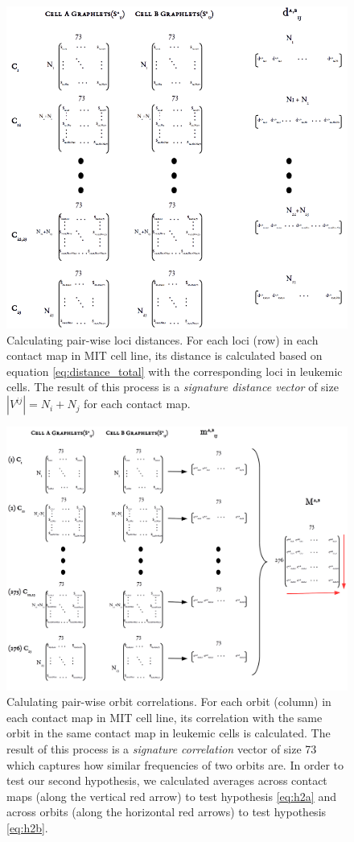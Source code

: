 \documentclass[a4,center,fleqn]{NAR}
\begin{document}
\begin{figure}
    \centering
    \includegraphics[width=.5\textwidth]{figures/graphlet_distance_schema.png}
    \caption{Calculating pair-wise loci distances. For each loci (row) 
    in each
    contact map in MIT cell line, its distance is calculated based on
    equation \ref{eq:distance_total} with the corresponding loci in
    leukemic cells. The result of this process is a 
    \textit{signature distance vector} of size
    $|V^{ij}| = N_i+N_j$ for each contact map.
    }
    \label{graphlet_distance_schema}
\end{figure}
\begin{figure}
    \centering
    \includegraphics[width=.5\textwidth]{figures/graphlet_correlation_schema.png}
    \caption{Calulating pair-wise orbit correlations. For each orbit (column)
    in each contact map in MIT cell line, its correlation with the
    same orbit in the same contact map 
    in leukemic cells is calculated. The result of
    this process is a \textit{signature correlation} vector of size
    73 which captures how similar frequencies of two orbits are.
    In order to test our second hypothesis, we calculated averages
    across contact maps (along the vertical red arrow) to test 
    hypothesis \ref{eq:h2a}
    and across orbits
    (along the horizontal red arrows) to test hypothesis \ref{eq:h2b}.}
    \label{graphlet_correlation_schema}
\end{figure}
\end{document}
